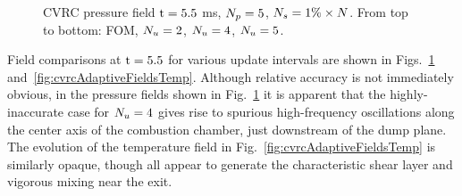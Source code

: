 \begin{figure}
\begin{minipage}{0.99\linewidth}
	\end{minipage}
    \begin{minipage}{0.99\linewidth}
	\end{minipage}
    \caption{\label{fig:cvrcAdaptiveFieldsPress}CVRC pressure field $\text{t} = 5.5$ ms, $N_p = 5$, $N_s = 1\% \times N$. From top to bottom: FOM, $N_u = 2$, $N_u = 4$, $N_u = 5$.}
\end{figure}

Field comparisons at $\text{t} = 5.5$ for various update intervals are shown in Figs.~\ref{fig:cvrcAdaptiveFieldsPress} and~\ref{fig:cvrcAdaptiveFieldsTemp}. Although relative accuracy is not immediately obvious, in the pressure fields shown in Fig.~\ref{fig:cvrcAdaptiveFieldsPress} it is apparent that the highly-inaccurate case for $N_u = 4$ gives rise to spurious high-frequency oscillations along the center axis of the combustion chamber, just downstream of the dump plane. The evolution of the temperature field in Fig.~\ref{fig:cvrcAdaptiveFieldsTemp} is similarly opaque, though all appear to generate the characteristic shear layer and vigorous mixing near the exit.

